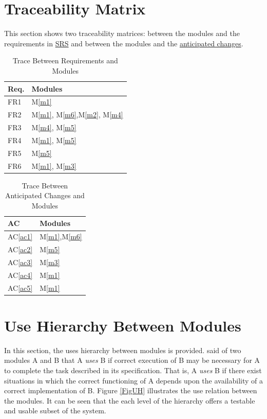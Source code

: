 \documentclass[12pt, titlepage]{article}
\newcommand{\acref}[1]{AC\ref{#1}}
\newcommand{\mref}[1]{M\ref{#1}}
\begin{document}
\section{Traceability Matrix} \label{SecTM}

This section shows two traceability matrices: between the modules and the requirements in
\href{run:../../SRS/SRS.pdf}{SRS} and between the modules and the \hyperref[SecAchange]{anticipated changes}.
\begin{table}[H]
\centering
\begin{tabular}{p{} p{}}
\toprule
\textbf{Req.} & \textbf{Modules}\\
\midrule
FR1 & \mref{m1}\\
FR2 & \mref{m1}, \mref{m6},\mref{m2}, \mref{m4}\\
FR3 & \mref{m4}, \mref{m5}\\
FR4 & \mref{m1}, \mref{m5}\\
FR5 & \mref{m5}\\
FR6 & \mref{m1}, \mref{m3}\\
\bottomrule
\end{tabular}
\caption{Trace Between Requirements and Modules}
\label{TblRT}
\end{table}

\begin{table}[H]
\centering
\begin{tabular}{p{} p{}}
\toprule
\textbf{AC} & \textbf{Modules}\\
\midrule
\acref{ac1} & \mref{m1},\mref{m6}\\
\acref{ac2} & \mref{m5}\\
\acref{ac3} & \mref{m3}\\
\acref{ac4} & \mref{m1}\\
\acref{ac5} & \mref{m1}\\
\bottomrule
\end{tabular}
\caption{Trace Between Anticipated Changes and Modules}
\label{TblACT}
\end{table}

\section{Use Hierarchy Between Modules} \label{SecUse}

In this section, the uses hierarchy between modules is
provided. \citet{Parnas1978} said of two modules A and B that A {\em uses} B if
correct execution of B may be necessary for A to complete the task described in
its specification. That is, A {\em uses} B if there exist situations in which
the correct functioning of A depends upon the availability of a correct
implementation of B.  Figure \ref{FigUH} illustrates the use relation between
the modules. It can be seen that the each level of the hierarchy offers a testable
and usable subset of the system.
\end{document}
